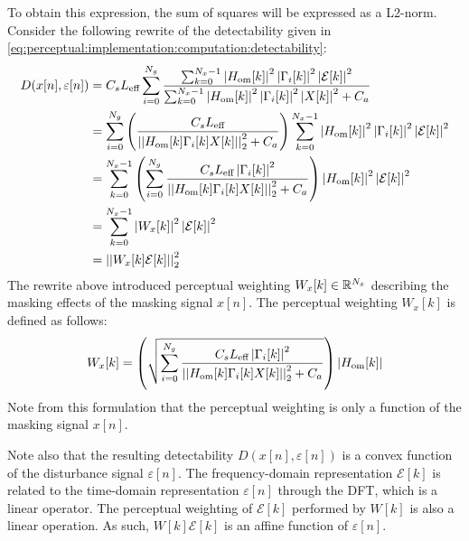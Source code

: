 To obtain this expression, the sum of squares will be expressed as a L2-norm.
Consider the following rewrite of the detectability given in \autoref{eq:perceptual:implementation:computation:detectability}: 
\begin{align*}
    D(x[n],\varepsilon[n]) &= C_s L_\text{eff}\sum_{i=0}^{N_g}
                        \frac{\sum_{k=0}^{N_x-1}\left|H_\text{om}[k]\right|^2\left|
                            \Gamma_i[k]\right|^2\left|\mathcal{E}[k]\right|^2}
                        {\sum_{k=0}^{N_x-1}\left|H_\text{om}[k]\right|^2\left|
                            \Gamma_i[k]\right|^2\left|X[k]\right|^2 + C_a} \\
                           &= \sum_{i=0}^{N_g}
                           \left(\frac{C_s L_\text{eff}}{\norm[2][2]{H_\text{om}[k]\Gamma_i[k]X[k]} + C_a}\right)
                        \sum_{k=0}^{N_x-1}\left|H_\text{om}[k]\right|^2\left|
                        \Gamma_i[k]\right|^2\left|\mathcal{E}[k]\right|^2 \\
                           &= \sum_{k=0}^{N_x-1}\left(\sum_{i=0}^{N_g}\frac{C_s L_\text{eff}\left|\Gamma_i[k]\right|^2}{\norm[2][2]{H_\text{om}[k]\Gamma_i[k]X[k]} + C_a}\right)
                        \left|H_\text{om}[k]\right|^2\left|\mathcal{E}[k]\right|^2 \\
                           &= \sum_{k=0}^{N_x-1}\left|W_x[k]\right|^2\left|\mathcal{E}[k]\right|^2 \\
                           &= \norm[2][2]{W_x[k]\mathcal{E}[k]} 
\end{align*}
The rewrite above introduced perceptual weighting $W_x[k]\in\mathbb{R}^{N_x}$ describing the masking effects of the masking signal $x[n]$. 
The perceptual weighting $W_x[k]$ is defined as follows: 
\begin{equation}
    W_x[k] = \left(\sqrt{\sum_{i=0}^{N_g}\frac{C_s L_\text{eff}\left|\Gamma_i[k]\right|^2}{\norm[2][2]{H_\text{om}[k]\Gamma_i[k]X[k]} + C_a}}\right)
                        \left|H_\text{om}[k]\right|
\end{equation}
Note from this formulation that the perceptual weighting is only a function of the masking signal $x[n]$.

Note also that the resulting detectability $D(x[n],\varepsilon[n])$ is a convex function of the disturbance signal $\varepsilon[n]$. 
The frequency-domain representation $\mathcal{E}[k]$ is related to the time-domain representation $\varepsilon[n]$ through the DFT, which is a linear operator.
The perceptual weighting of $\mathcal{E}[k]$ performed by $W[k]$ is also a linear operation.
As such, $W[k]\mathcal{E}[k]$ is an affine function of $\varepsilon[n]$.



